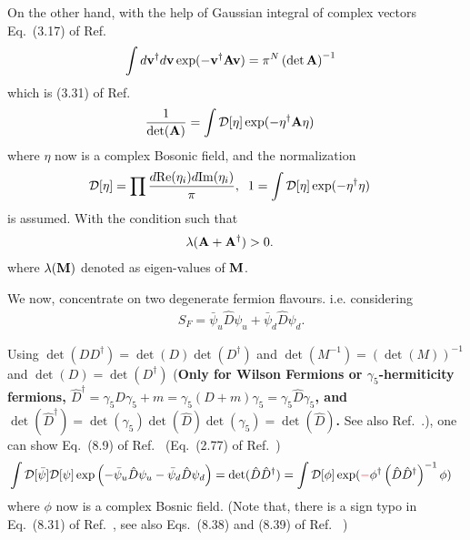On the other hand, with the help of Gaussian integral of complex vectors Eq.~(3.17) of Ref.~\cite{condensedmatterbookAltland}
\begin{equation}
\begin{split}
&\int d{\bf v}^{\dagger}d{\bf v} \exp (-{\bf v}^{\dagger} {\bf A} {\bf v})=\pi ^N \left(\det {\bf A}\right)^{-1}
\end{split}
\end{equation}
which is (3.31) of Ref.~\cite{latticeqcdbook2017}
\begin{equation}
\begin{split}
&\frac{1}{ \det ({\bf A}) }=\int \mathcal{D}[\eta] \exp (-\eta^{\dagger} {\bf A} \eta)
\end{split}
\end{equation}
where $\eta$ now is a complex Bosonic field, and the normalization
\begin{equation}
\begin{split}
&\mathcal{D}[\eta] = \prod \frac{d{\rm Re}(\eta _i)d{\rm Im}(\eta _i)}{\pi},\;\;1=\int \mathcal{D}[\eta] \exp (-\eta^{\dagger} \eta)
\end{split}
\end{equation}
is assumed. With the condition such that
\begin{equation}
\begin{split}
&\lambda ({\bf A}+{\bf A}^{\dagger}) > 0.
\end{split}
\end{equation}
where $\lambda ({\bf M})$ denoted as eigen-values of ${\bf M}$.

We now, concentrate on two degenerate fermion flavours. i.e. considering
\begin{equation}
\begin{split}
&S_F=\bar{\psi}_u \hat{D} \psi _u+\bar{\psi}_d \hat{D} \psi _d.
\end{split}
\end{equation}

Using $\det (DD^{\dagger})=\det (D)\det (D^{\dagger})$ and $\det(M^{-1})=\left(\det (M)\right)^{-1}$ and \textcolor[rgb]{1,0,0}{$\det (D)=\det (D^{\dagger})$} (\textbf{Only for Wilson Fermions or $\gamma _5$-hermiticity fermions, $\hat{D}^{\dagger}=\gamma _5 D \gamma _5 + m=\gamma _5 (D+m) \gamma _5=\gamma _5 \hat{D} \gamma _5$, and $\det(\hat{D}^{\dagger})=\det(\gamma _5)\det(\hat{D})\det(\gamma _5)=\det (\hat{D})$.} See also Ref.~\cite{weingarten1981}.), one can show Eq.~(8.9) of Ref.~\cite{latticeqcdbook2010} (Eq.~(2.77) of Ref.~\cite{latticeqcdreview2009})
\begin{equation}
\begin{split}
&\int \mathcal{D}[\bar{\psi}]\mathcal{D}[\psi]\exp\left(-\bar{\psi}_u \hat{D} \psi _u-\bar{\psi}_d \hat{D} \psi _d\right)=\det (\hat{D}\hat{D}^{\dagger})=\int \mathcal{D}[\phi] \exp (\textcolor[rgb]{1,0,0}{-}\phi ^{\dagger}\left(\hat{D}\hat{D}^{\dagger}\right)^{-1} \phi)
\end{split}
\end{equation}
where $\phi$ now is a complex Bosnic field. (Note that, there is a sign typo in Eq.~(8.31) of Ref.~\cite{latticeqcdbook2010}, see also Eqs.~(8.38) and (8.39) of Ref.~\cite{latticeqcdbook2010} )

